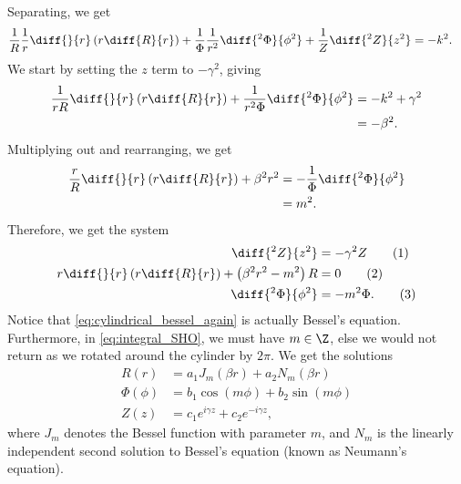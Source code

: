 \documentclass[10pt]{mypackage}
\begin{document}
  Separating, we get
  \begin{align*}
    \frac{1}{R}\frac{1}{r}\diff{}{r}\left( r \diff{R}{r} \right) + \frac{1}{\Phi}\frac{1}{r^2}\diff{^2\Phi}{\phi^2} + \frac{1}{Z}\diff{^2Z}{z^2} &= -k^2.
  \end{align*}
  We start by setting the $z$ term to $-\gamma^2$, giving
  \begin{align*}
    \frac{1}{rR}\diff{}{r}\left( r\diff{R}{r} \right) + \frac{1}{r^2\Phi}\diff{^2\Phi}{\phi^2} &= -k^2 + \gamma^2\\
                                                                                               &= -\beta^2.
  \end{align*}
  Multiplying out and rearranging, we get
  \begin{align*}
    \frac{r}{R}\diff{}{r}\left( r\diff{R}{r} \right) + \beta^2r^2 &= -\frac{1}{\Phi}\diff{^2\Phi}{\phi^2}\\
                                                                  &= m^2.
  \end{align*}
  Therefore, we get the system
  \begin{align*}
    \diff{^2Z}{z^2} &= -\gamma^2 Z\label{eq:linear_SHO}\tag{1}\\
    r\diff{}{r}\left( r \diff{R}{r} \right) + \left( \beta^2r^2 - m^2 \right)R &= 0\label{eq:cylindrical_bessel_again}\tag{2}\\
    \diff{^2\Phi}{\phi^2} &= -m^2\Phi.\label{eq:integral_SHO}\tag{3}
  \end{align*}
  Notice that \eqref{eq:cylindrical_bessel_again} is actually Bessel's equation. Furthermore, in \eqref{eq:integral_SHO}, we must have $m\in\Z$, else we would not return as we rotated around the cylinder by $2\pi$. We get the solutions
  \begin{align*}
    R(r) &= a_1J_m\left( \beta r \right) + a_2N_m\left( \beta r \right)\\
    \Phi(\phi) &= b_1\cos\left( m\phi \right) + b_2\sin\left( m\phi \right)\\
    Z(z) &= c_1e^{i\gamma z} + c_2e^{-i\gamma z},
  \end{align*}
  where $J_m$ denotes the Bessel function with parameter $m$, and $N_m$ is the linearly independent second solution to Bessel's equation (known as Neumann's equation).\newline
\end{document}
